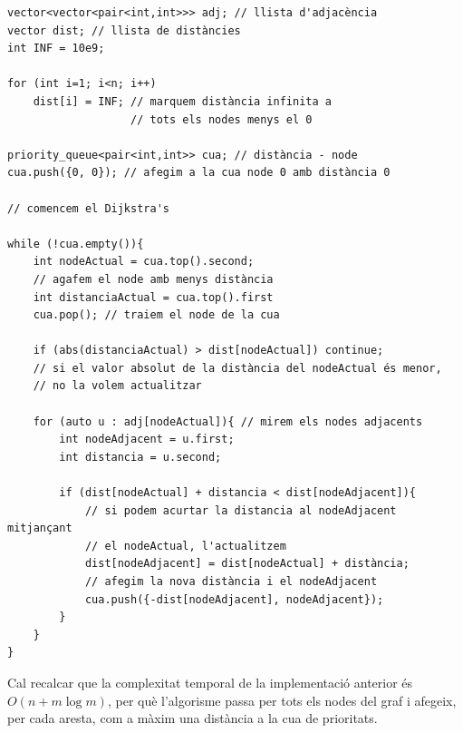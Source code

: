 \begin{lstlisting}
vector<vector<pair<int,int>>> adj; // llista d'adjacència
vector dist; // llista de distàncies
int INF = 10e9;

for (int i=1; i<n; i++)
    dist[i] = INF; // marquem distància infinita a
                   // tots els nodes menys el 0

priority_queue<pair<int,int>> cua; // distància - node
cua.push({0, 0}); // afegim a la cua node 0 amb distància 0

// comencem el Dijkstra's

while (!cua.empty()){
    int nodeActual = cua.top().second; 
    // agafem el node amb menys distància
    int distanciaActual = cua.top().first
    cua.pop(); // traiem el node de la cua
    
    if (abs(distanciaActual) > dist[nodeActual]) continue;
    // si el valor absolut de la distància del nodeActual és menor,
    // no la volem actualitzar
    
    for (auto u : adj[nodeActual]){ // mirem els nodes adjacents
        int nodeAdjacent = u.first;
        int distancia = u.second;
        
        if (dist[nodeActual] + distancia < dist[nodeAdjacent]){
            // si podem acurtar la distancia al nodeAdjacent mitjançant
            // el nodeActual, l'actualitzem
            dist[nodeAdjacent] = dist[nodeActual] + distància;
            // afegim la nova distància i el nodeAdjacent
            cua.push({-dist[nodeAdjacent], nodeAdjacent});
        }
    }
}

\end{lstlisting}

Cal recalcar que la complexitat temporal de la implementació anterior és $O(n + m \log m)$, per
què l'algorisme passa per tots els nodes del graf i afegeix, per cada aresta, com a màxim una distància a la cua de prioritats.
